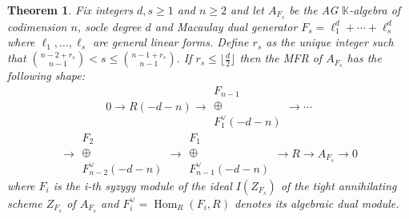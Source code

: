 \documentclass[12pt,twoside]{amsart}
\numberwithin{equation}{section} \hyphenation{semi-stable}
\newcommand{\K}{\mathbb{K}}
\newtheorem{theorem}{Theorem}[section]
\theoremstyle{definition}
\begin{document}
\begin{theorem}\label{mainthm1} Fix integers $d,s\ge 1$ and $n\ge 2$ and let $A_{F_s}$ be the AG $\K$-algebra  of codimension $n$, socle degree $d$ and Macaulay dual generator $F_s=\ell_1^d+\cdots +\ell_s^d$ where $\ell_1, \ldots ,\ell_s$ are general linear forms. 
Define  $r_s$ as the unique integer such that
    $ {n-2+r_s\choose n-1}<s\le {n-1+r_s\choose n-1}.$ If   $r_s\le  \lfloor\frac{d}{2}\rfloor $ then the MFR of $A_{F_s}$ has the following shape:
    $$ 
    0\longrightarrow  R(-d-n)  \longrightarrow  \begin{array}{c} F_{n-1} \\ \oplus \\ F_1^{\vee}(-d-n) \end{array}\longrightarrow \cdots $$
    $$
\longrightarrow \begin{array}{c} F_2 \\  \oplus \\ F_{n-2}^{\vee}(-d-n)  \end{array}
\longrightarrow \begin{array}{c} F_1 \\ \oplus \\ F_{n-1}^{\vee}(-d-n) \end{array} \longrightarrow R\longrightarrow A_{F_s} \longrightarrow 0
    $$
where $F_i$ is the i-th syzygy module of the ideal $I(Z_{F_s})$ of the tight annihilating scheme $Z_{F_s}$ of $A_{F_s}$ and $F_i^{\vee} = \operatorname{Hom}_R(F_i, R)$ denotes its algebraic dual module. 
    
\end{theorem}
\end{document}
